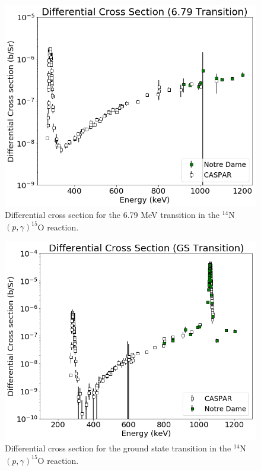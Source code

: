 \begin{figure}
		\includegraphics[width=1.0\linewidth]{figures/cs679.png}
	\caption{Differential cross section for the 6.79 MeV transition in the $^{14}$N$\left( p,\gamma \right) ^{15}$O reaction. }
	\label{fig: cs679}
\end{figure}



\begin{figure}
		\includegraphics[width=1.0\linewidth]{figures/csGS.png}
	\caption{Differential cross section for the ground state transition in the $^{14}$N$\left( p,\gamma \right) ^{15}$O reaction. }
	\label{fig: csGS}
\end{figure}


